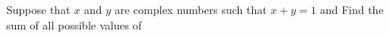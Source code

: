 Suppose that $x$ and $y$ are complex numbers such that $x+y=1$ and   Find the sum of all possible values of 